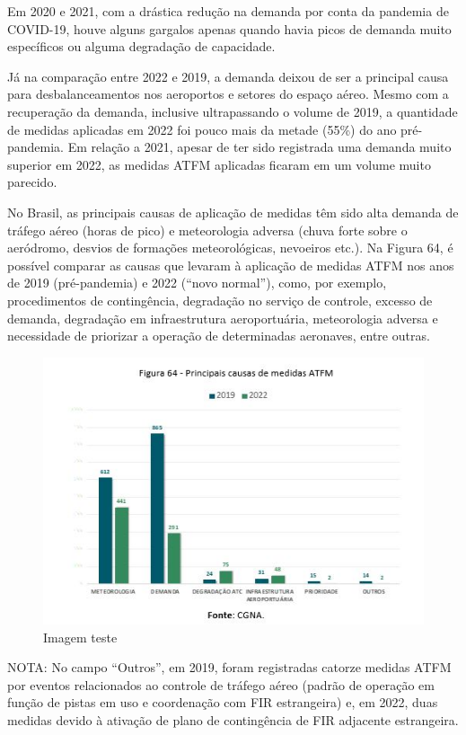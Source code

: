 \documentclass[
]{book}
\begin{document}
Em 2020 e 2021, com a drástica redução na demanda por conta da pandemia de COVID-19, houve alguns gargalos apenas quando havia picos de demanda muito específicos ou alguma degradação de capacidade.

Já na comparação entre 2022 e 2019, a demanda deixou de ser a principal causa para desbalanceamentos nos aeroportos e setores do espaço aéreo. Mesmo com a recuperação da demanda, inclusive ultrapassando o volume de 2019, a quantidade de medidas aplicadas em 2022 foi pouco mais da metade (55\%) do ano pré-pandemia. Em relação a 2021, apesar de ter sido registrada uma demanda muito superior em 2022, as medidas ATFM aplicadas ficaram em um volume muito parecido.

No Brasil, as principais causas de aplicação de medidas têm sido alta demanda de tráfego aéreo (horas de pico) e meteorologia adversa (chuva forte sobre o aeródromo, desvios de formações meteorológicas, nevoeiros etc.). Na Figura 64, é possível comparar as causas que levaram à aplicação de medidas ATFM nos anos de 2019 (pré-pandemia) e 2022 (``novo normal''), como, por exemplo, procedimentos de contingência, degradação no serviço de controle, excesso de demanda, degradação em infraestrutura aeroportuária, meteorologia adversa e necessidade de priorizar a operação de determinadas aeronaves, entre outras.

\begin{figure}
\centering
\includegraphics{imagens/fig53.jpg}
\caption{Imagem teste}
\end{figure}

NOTA: No campo ``Outros'', em 2019, foram registradas catorze medidas ATFM por eventos relacionados ao controle de tráfego aéreo (padrão de operação em função de pistas em uso e coordenação com FIR estrangeira) e, em 2022, duas medidas devido à ativação de plano de contingência de FIR adjacente estrangeira.
\end{document}

